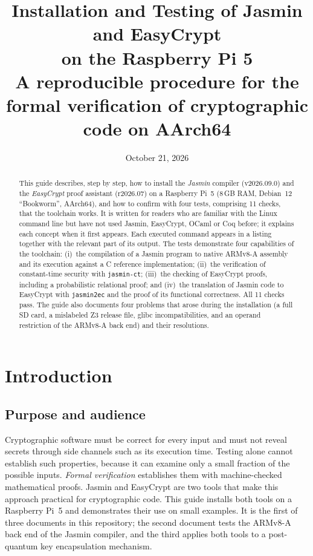 \documentclass[11pt,a4paper]{article}
\title{\textbf{Installation and Testing of Jasmin and EasyCrypt\\on the Raspberry Pi 5}\\[4pt]
  \large A reproducible procedure for the formal verification of cryptographic code on AArch64}
\author{}
\date{October 21, 2026}
\begin{document}
\maketitle
\thispagestyle{empty}

\begin{abstract}
\noindent
This guide describes, step by step, how to install the \emph{Jasmin}
compiler (v2026.09.0) and the \emph{EasyCrypt} proof assistant (r2026.07)
on a Raspberry Pi~5 (8\,GB RAM, Debian~12 ``Bookworm'', AArch64), and how
to confirm with four tests, comprising 11 checks, that the toolchain
works. It is written for readers
who are familiar with the Linux command line but have not used Jasmin,
EasyCrypt, OCaml or Coq before; it explains each concept when it first
appears. Each executed command appears in a listing together with the
relevant part of its output. The tests demonstrate four capabilities of the
toolchain:
(i)~the compilation of a Jasmin program to native ARMv8-A assembly and its
execution against a C reference implementation;
(ii)~the verification of constant-time security with \texttt{jasmin-ct};
(iii)~the checking of EasyCrypt proofs, including a probabilistic
relational proof; and
(iv)~the translation of Jasmin code to EasyCrypt with \texttt{jasmin2ec}
and the proof of its functional correctness. All 11 checks pass.
The guide also documents four problems that arose during the installation
(a full SD card, a mislabeled Z3 release file, glibc incompatibilities, and
an operand restriction of the ARMv8-A back end) and their resolutions.
\end{abstract}

\tableofcontents
\newpage

\section{Introduction}

\subsection{Purpose and audience}

Cryptographic software must be correct for every input and must not reveal
secrets through side channels such as its execution time. Testing alone
cannot establish such properties, because it can examine only a small
fraction of the possible inputs. \emph{Formal verification} establishes them with machine-checked
mathematical proofs. Jasmin and EasyCrypt are two tools that make this
approach practical for cryptographic code. This guide installs both tools
on a Raspberry Pi~5 and demonstrates their use on small examples. It is the
first of three documents in this repository; the second document tests the
ARMv8-A back end of the Jasmin compiler, and the third applies both tools to
a post-quantum key encapsulation mechanism.
\end{document}
